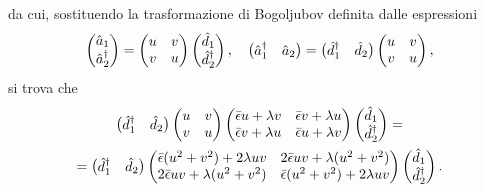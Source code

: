 da cui, sostituendo la trasformazione di Bogoljubov definita dalle espressioni
\begin{equation}
    \begin{pmatrix}
        \hat{a}_1 \\
        \hat{a}^\dagger_2
    \end{pmatrix} = 
    \begin{pmatrix}
        u & v \\
        v & u
    \end{pmatrix}
    \begin{pmatrix}
        \hat{d}_1 \\
        \hat{d}^\dagger_2
    \end{pmatrix}, \quad 
    \begin{pmatrix}
        \hat{a}^\dagger_1 & \hat{a}_2
    \end{pmatrix} = 
    \begin{pmatrix}
        \hat{d}^\dagger_1 & \hat{d}_2
    \end{pmatrix}
    \begin{pmatrix}
        u & v \\
        v & u
    \end{pmatrix},
\end{equation}
si trova che
\begin{multline}
    \begin{pmatrix}
        \hat{d}^\dagger_1 & \hat{d}_2
    \end{pmatrix}
    \begin{pmatrix}
        u & v \\
        v & u
    \end{pmatrix}
    \begin{pmatrix}
        \bar{\epsilon}u + \lambda v & \bar{\epsilon}v + \lambda u \\
        \bar{\epsilon}v + \lambda u & \bar{\epsilon}u + \lambda v
    \end{pmatrix}
    \begin{pmatrix}
        \hat{d}_1 \\
        \hat{d}^\dagger_2
    \end{pmatrix} = \\
    = \begin{pmatrix}
        \hat{d}^\dagger_1 & \hat{d}_2
    \end{pmatrix}
    \begin{pmatrix}
        \bar{\epsilon}(u^2 + v^2) + 2\lambda uv & 2\bar{\epsilon} uv + \lambda(u^2 + v^2) \\
        2\bar{\epsilon} uv + \lambda(u^2 + v^2) & \bar{\epsilon}(u^2 + v^2) + 2\lambda uv 
    \end{pmatrix}
    \begin{pmatrix}
        \hat{d}_1 \\
        \hat{d}^\dagger_2
    \end{pmatrix}.
\end{multline}
